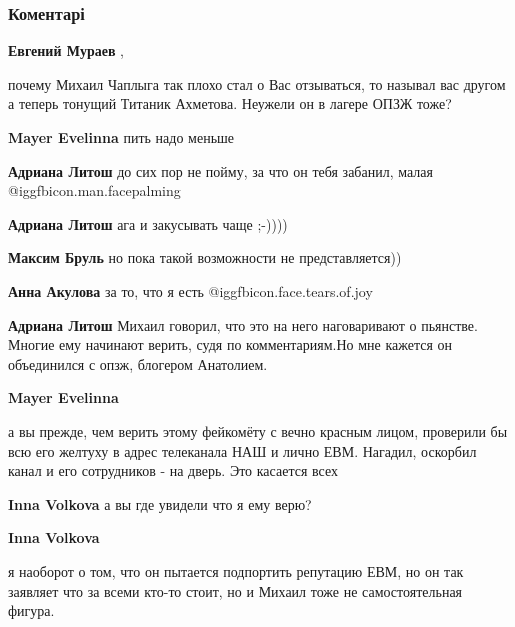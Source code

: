  
 
 
 
 
\subsubsection{Коментарі}
\label{sec:26_11_2021.fb.murajev_jevgenij.1.formula_strany.cmt}

\begin{itemize} %
\textbf{Евгений Мураев} , 

почему Михаил Чаплыга так плохо стал о Вас отзываться, то называл вас другом а
теперь тонущий Титаник Ахметова. Неужели он в лагере ОПЗЖ тоже?

\begin{itemize} %
\textbf{Mayer Evelinna} пить надо меньше

\textbf{Адриана Литош} до сих пор не пойму, за что он тебя забанил, малая @igg{fbicon.man.facepalming} 

\textbf{Адриана Литош} ага и закусывать чаще ;-))))

\textbf{Максим Бруль} но пока такой возможности не представляется))

\textbf{Анна Акулова} за то, что я есть  @igg{fbicon.face.tears.of.joy} 

\textbf{Адриана Литош} Михаил говорил, что это на него наговаривают о пьянстве. Многие ему начинают верить, судя по комментариям.Но мне кажется он объединился с опзж, блогером Анатолием.

\textbf{Mayer Evelinna} 

а вы прежде, чем верить этому фейкомёту с вечно красным лицом, проверили бы всю
его желтуху в адрес телеканала НАШ и лично ЕВМ. Нагадил, оскорбил канал и его
сотрудников - на дверь. Это касается всех

\textbf{Inna Volkova} а вы где увидели что я ему верю?

\textbf{Inna Volkova} 

я наоборот о том, что он пытается подпортить репутацию ЕВМ, но он так заявляет
что за всеми кто-то стоит, но и Михаил тоже не самостоятельная фигура.


\end{itemize}
\end{itemize}
